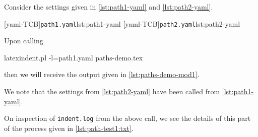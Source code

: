 \documentclass[10pt]{article}
\begin{document}
  \begin{example}
  Consider the settings given in \cref{lst:path1-yaml} and \cref{lst:path2-yaml}.

  \begin{cmhtcbraster}[raster column skip=.1\linewidth]
   [yaml-TCB]{\texttt{path1.yaml}}{lst:path1-yaml}
   [yaml-TCB]{\texttt{path2.yaml}}{lst:path2-yaml}
  \end{cmhtcbraster}

  Upon calling

  \begin{commandshell}
latexindent.pl -l=path1.yaml paths-demo.tex
\end{commandshell}

  then we will receive the output given in \cref{lst:paths-demo-mod1}.


  We note that the settings from \cref{lst:path2-yaml} have been called from
  \cref{lst:path1-yaml}.

  On inspection of \texttt{indent.log} from the above call, we see the details of this
  part of the process given in \cref{lst:path-test1:txt}.

  \end{example}
\end{document}
